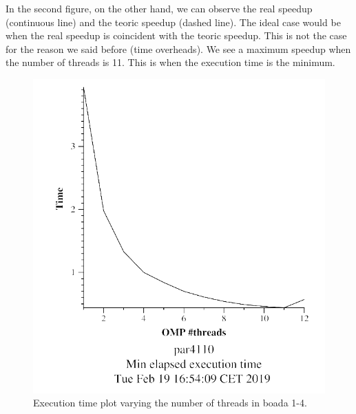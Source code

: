 \documentclass[12pt, a4paper]{article}
\begin{document}
In the second figure, on the other hand, we can observe the real speedup (continuous line) and the teoric speedup (dashed line). The ideal case would be when the real speedup is coincident with the teoric speedup. This is not the case for the reason we said before (time overheads). We see a maximum speedup when the number of threads is 11. This is when the execution time is the minimum.

\begin{figure}[ht]
\begin{minipage}[b]{0.45\linewidth}
\centering
\includegraphics[width=\textwidth]{./images/strong_v1_1}
\caption{Execution time plot varying the number of threads in boada 1-4.}
\label{fig:strong_v1_1}
\end{minipage}
\hspace{0.5cm}
\begin{minipage}[b]{0.45\linewidth}
\centering

\end{minipage}
\end{figure}
\end{document}
